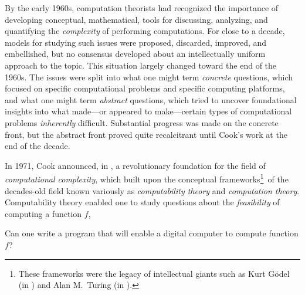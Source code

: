 {By the early 1960s, computation theorists had recognized the importance of developing conceptual, mathematical, tools for discussing, analyzing, and quantifying the {\em complexity} of performing computations.  For close to a decade, models for studying such issues were proposed, discarded, improved, and embellished, but no consensus developed about an intellectually uniform approach to the topic.  This situation largely changed toward the end of the 1960s.  The issues were split into what one might term {\em concrete} questions, which focused on specific computational problems and specific computing platforms, and what one might term {\em abstract} questions, which tried to uncover foundational insights into what made---or appeared to make---certain types of computational problems {\em inherently} difficult.  Substantial progress was made on the concrete front, but the abstract front proved quite recalcitrant until Cook's work at the end of the decade.

\medskip

 
In 1971, Cook announced, in \cite{Cook71}, a revolutionary foundation for the field of {\it computational complexity}, which built upon the conceptual frameworks\footnote{These frameworks were the legacy of intellectual giants such as Kurt G\"{o}del (in \cite{Goedel31}) and Alan M.~Turing (in \cite{Turing36}).}~of the decades-old field known variously as {\it computability theory}  and {\it computation theory}.   Computability theory enabled one to study questions about the {\em feasibility} of computing a function $f$,

\smallskip

\noindent
Can one write a program that will enable a digital computer to compute function $f$?

\smallskip


}
